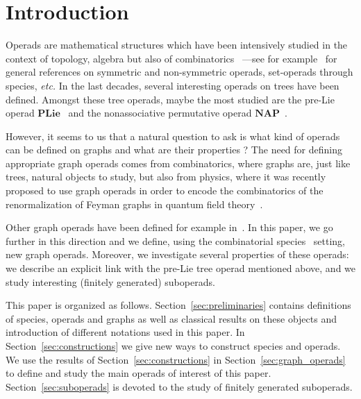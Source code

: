 \documentclass[a4paper]{article}
\theoremstyle{definition}
\newcommand{\PLie}{\mathbf{PLie}}
\newcommand{\NAP}{\mathbf{NAP}}
\begin{document}
\section*{Introduction}
Operads are mathematical structures which have been intensively studied in the context of
topology, algebra \cite{LV12} but also of combinatorics~\cite{CSLC} ---see for
example~\cite{Men15, Gir18} for general references on symmetric and non-symmetric operads,
set-operads through species, {\em etc.} In the last decades, several interesting operads on
trees have been defined. Amongst these tree operads, maybe the most studied are the pre-Lie
operad $\PLie$~\cite{CL01} and the nonassociative permutative operad $\NAP$~\cite{Liv06}.

However, it seems to us that a natural question to ask is what kind of operads can be
defined on graphs and what are their properties ? The need for defining appropriate graph
operads comes from combinatorics, where graphs are, just like trees, natural objects to
study, but also from physics, where it was recently proposed to use graph operads in order
to encode the combinatorics of the renormalization of Feyman graphs in quantum field
theory~\cite{Kreimer:2000ja}.

Other graph operads have been defined for example in~\cite{Kon99,Wil05,Men15,Gir17,MV19}.
In this paper, we go further in this direction and we define, using the combinatorial
species~\cite{BLL98} setting, new graph operads. Moreover, we investigate several properties
of these operads: we describe an explicit link with the pre-Lie tree operad mentioned above,
and we study interesting (finitely generated) suboperads.

This paper is organized as follows. Section~\ref{sec:preliminaries} contains definitions of 
species, operads and graphs as well as classical results on these objects and introduction of
different notations used in this paper. In Section~\ref{sec:constructions} we give new ways to
construct species and operads. We use the results of Section~\ref{sec:constructions} in 
Section~\ref{sec:graph_operads} to define and study the main operads of interest of this paper. 
Section~\ref{sec:suboperads} is devoted to the study of finitely generated suboperads.

\end{document}
